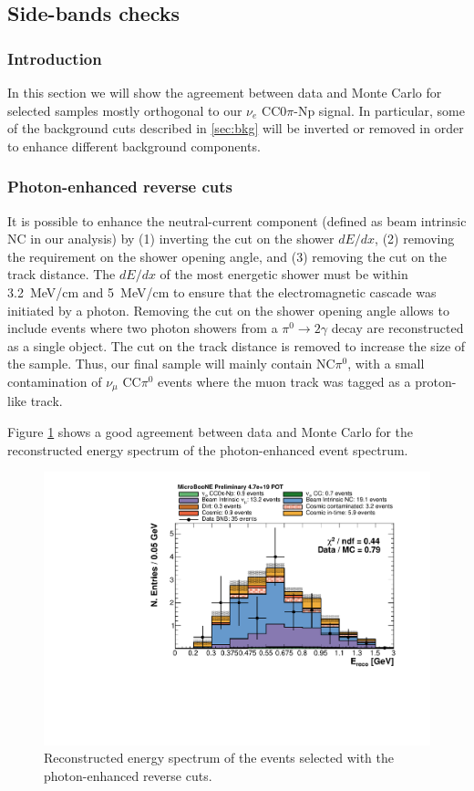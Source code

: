 \subsection{Side-bands checks}
\subsubsection{Introduction}
In this section we will show the agreement between data and Monte Carlo for selected samples mostly orthogonal to our $\nu_{e}$ CC0$\pi$-Np signal. In particular, some of the background cuts described in \ref{sec:bkg} will be inverted or removed in order to enhance different background components.

\subsubsection{Photon-enhanced reverse cuts}
It is possible to enhance the neutral-current component (defined as beam intrinsic NC in our analysis) by (1) inverting the cut on the shower $dE/dx$, (2) removing the requirement on the shower opening angle, and (3) removing the cut on the track distance. The $dE/dx$ of the most energetic shower must be within 3.2~MeV/cm and 5~MeV/cm to ensure that the electromagnetic cascade was initiated by a photon. Removing the cut on the shower opening angle allows to include events where two photon showers from a $\pi^{0}\rightarrow 2\gamma$ decay are reconstructed as a single object. The cut on the track distance is removed to increase the size of the sample.
Thus, our final sample will mainly contain NC$\pi^{0}$, with a small contamination of $\nu_{\mu}$ CC$\pi^{0}$ events where the muon track was tagged as a proton-like track.

Figure \ref{fig:photon} shows a good agreement between data and Monte Carlo for the reconstructed energy spectrum of the photon-enhanced event spectrum.

\begin{figure}[htbp]
\centering
  \includegraphics[width=0.65\linewidth]{figures/nc_reco.pdf}
  \caption{Reconstructed energy spectrum of the events selected with the photon-enhanced reverse cuts.}\label{fig:photon}
\end{figure}

